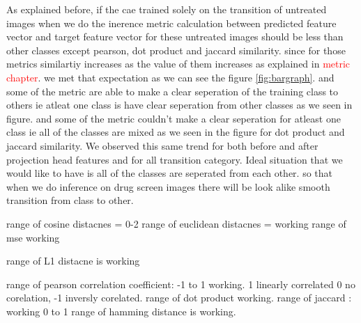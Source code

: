 As explained before, if the cae trained solely on the transition of untreated images when we do the inerence metric calculation between predicted feature vector and target feature vector for these untreated images should be less than other classes  except pearson, dot product and jaccard similarity. since for those metrics similartiy increases as the value of them increases as explained in \textcolor{red}{ metric chapter}. we met that expectation as we can see the figure \ref{fig:bargraph}.  and some of the metric are able to make a clear seperation of the training class to others ie atleat one class is have clear seperation from other classes as we seen in figure. and some of the metric couldn't make a clear seperation for atleast one class ie all of the classes are mixed as we seen in the figure for dot product and jaccard similarity. We observed this same trend  for both before and after projection head features and for all transition category. Ideal situation that we would like to have is all of the classes are seperated from each other. so that when we do inference on drug screen images there will be look alike smooth transition from class to other.




range of cosine distacnes = 0-2
range of euclidean distacnes = working
range of mse working

range of L1 distacne is working

range of pearson correlation coefficient: -1 to 1 working. 1 linearly correlated 0 no corelation, -1 inversly corelated.
range of dot product  working.
range of jaccard : working 0 to 1
range of hamming distance is working.


